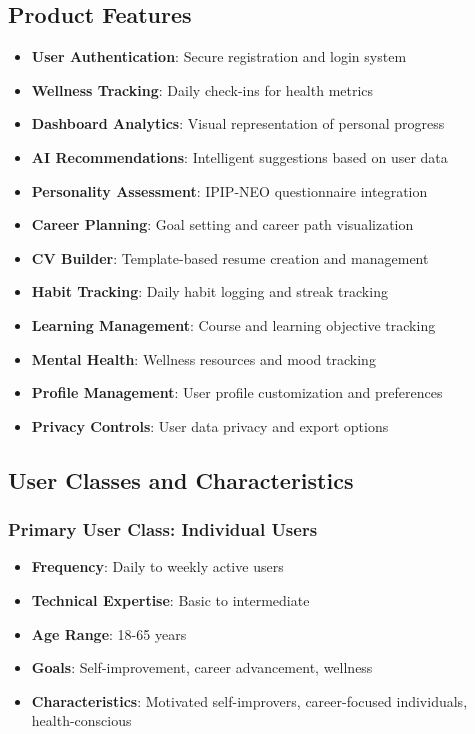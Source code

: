 \documentclass[12pt,a4paper]{article}
\begin{document}
\subsection{Product Features}
\begin{itemize}
    \item \textbf{User Authentication}: Secure registration and login system
    \item \textbf{Wellness Tracking}: Daily check-ins for health metrics
    \item \textbf{Dashboard Analytics}: Visual representation of personal progress
    \item \textbf{AI Recommendations}: Intelligent suggestions based on user data
    \item \textbf{Personality Assessment}: IPIP-NEO questionnaire integration
    \item \textbf{Career Planning}: Goal setting and career path visualization
    \item \textbf{CV Builder}: Template-based resume creation and management
    \item \textbf{Habit Tracking}: Daily habit logging and streak tracking
    \item \textbf{Learning Management}: Course and learning objective tracking
    \item \textbf{Mental Health}: Wellness resources and mood tracking
    \item \textbf{Profile Management}: User profile customization and preferences
    \item \textbf{Privacy Controls}: User data privacy and export options
\end{itemize}

\subsection{User Classes and Characteristics}

\subsubsection{Primary User Class: Individual Users}
\begin{itemize}
    \item \textbf{Frequency}: Daily to weekly active users
    \item \textbf{Technical Expertise}: Basic to intermediate
    \item \textbf{Age Range}: 18-65 years
    \item \textbf{Goals}: Self-improvement, career advancement, wellness
    \item \textbf{Characteristics}: Motivated self-improvers, career-focused individuals, health-conscious
\end{itemize}
\end{document}
